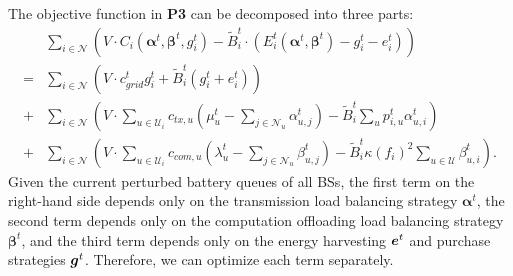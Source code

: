 \documentclass[12pt, draftclsnofoot, letterpaper, onecolumn]{IEEEtran}
\begin{document}
The objective function in \textbf{P3} can be decomposed into three parts:
\begin{equation}\label{p3_decom}
\begin{split}
&\sum_{i\in\mathcal{N}}\left(V\cdot C_i(\bm\alpha^t, \bm\beta^t, g^t_i) - \tilde{B}^t_i \cdot(E_i^t(\bm\alpha^t, \bm{\beta}^t) - g^t_i - e^t_i)\right)\\
=&\sum_{i\in\mathcal{N}}\left(V\cdot c^t_{grid}g^t_i + \tilde{B}^t_i (g^t_i + e^t_i) \right)\\
+ &\sum_{i\in\mathcal{N}}\left(V\cdot \sum_{u\in\mathcal{U}_i}c_{tx,u}(\mu^t_u - \sum_{j\in\mathcal{N}_u}\alpha^t_{u,j}) - \tilde{B}^t_i \sum_u p^t_{i,u}\alpha^t_{u,i}\right) \\
+&\sum_{i\in\mathcal{N}} \left( V\cdot \sum_{u\in \mathcal{U}_i}c_{com,u}(\lambda^t_u - \sum_{j\in\mathcal{N}_u}\beta^t_{u,j}) - \tilde{B}^t_i \kappa(f_i)^2 \sum_{u\in\mathcal{U}}\beta^t_{u,i}\right).
\end{split}
\end{equation}
Given the current  perturbed battery queues of all BSs, the first term on the right-hand side depends only on the transmission load balancing strategy $\bm\alpha^t$, the second term depends only on the computation offloading load balancing strategy $\bm\beta^t$, and the third term depends only on the energy harvesting ${\boldsymbol{e}}^t$ and purchase strategies ${\boldsymbol{g}}^t$. Therefore, we can optimize each term separately.


\vspace{-10pt}
\end{document}
